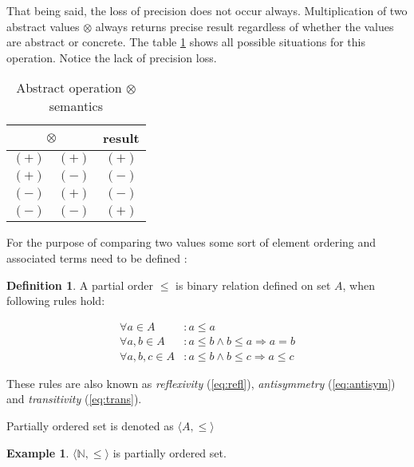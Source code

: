 \documentclass[12pt,final,oneside]{fithesis2}
\theoremstyle{definition}
\newtheorem{definition}{Definition}
\newtheorem{example}{Example}
\begin{document}
That being said, the loss of precision does not occur always. Multiplication
of two abstract values $\otimes$ always returns precise result regardless
of whether the values are abstract or concrete. The table
\ref{tab:abstractmult} shows all possible situations for this operation.
Notice the lack of precision loss.

\begin{table}[ht]
\centering
\begin{tabular}{c|c|c}
\multicolumn{2}{c|}{$\otimes$} & result \\
\hline
$(+)$ & $(+)$ & $(+)$ \\
$(+)$ & $(-)$ & $(-)$ \\
$(-)$ & $(+)$ & $(-)$ \\
$(-)$ & $(-)$ & $(+)$ \\
\end{tabular}
\caption{Abstract operation $\otimes$ semantics}
\label{tab:abstractmult}
\end{table}


For the purpose of comparing two values some sort of element ordering and
associated terms need to be defined \cite{Burris81-1}:

\begin{definition}
A partial order $\leq$ is binary relation defined on set $A$, when following
rules hold:

\begin{align}
\forall a \in A &: a \leq a \label{eq:refl} \\
\forall a, b \in A &: a \leq b \land b \leq a \Rightarrow a = b \label{eq:antisym} \\
\forall a, b, c \in A &: a \leq b \land b \leq c \Rightarrow a \leq c \label{eq:trans}
\end{align}

These rules are also known as \textit{reflexivity} (\ref{eq:refl}),
\textit{antisymmetry} (\ref{eq:antisym}) and \textit{transitivity} (\ref{eq:trans}).

Partially ordered set is denoted as $\langle A, \leq \rangle$
\end{definition}

\begin{example}
$\langle \mathbb{N}, \leq \rangle$ is partially ordered set.
\end{example}
\end{document}
